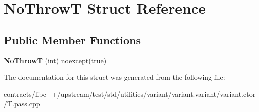 \hypertarget{struct_no_throw_t}{}\section{No\+ThrowT Struct Reference}
\label{struct_no_throw_t}
\subsection*{Public Member Functions}
\begin{DoxyCompactItemize}
\item 
\mbox{\label{struct_no_throw_t_ab13e46d990c0373600595cab77ade086}} 
{\bfseries No\+ThrowT} (int) noexcept(true)
\end{DoxyCompactItemize}


The documentation for this struct was generated from the following file\+:\begin{DoxyCompactItemize}
\item 
contracts/libc++/upstream/test/std/utilities/variant/variant.\+variant/variant.\+ctor/T.\+pass.\+cpp\end{DoxyCompactItemize}

